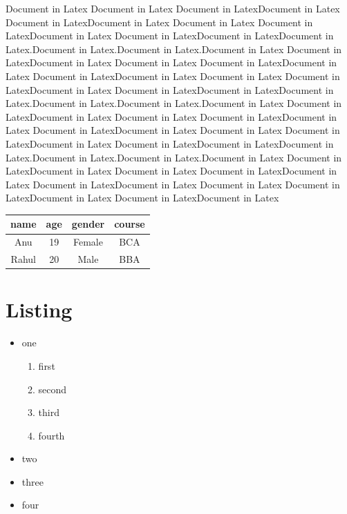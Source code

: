 \documentclass[12pt]{report} %
\begin{document}
\begin{multicols}{2}
Document in Latex Document in Latex Document in LatexDocument in Latex Document in LatexDocument in Latex Document in Latex Document in LatexDocument in Latex Document in LatexDocument in LatexDocument in Latex.Document in Latex.Document in Latex.Document in Latex Document 
in LatexDocument in Latex Document in Latex Document in LatexDocument in Latex Document in 
LatexDocument in Latex Document in Latex Document in LatexDocument in Latex Document in LatexDocument in LatexDocument in Latex.Document in Latex.Document in Latex.Document in Latex Document in LatexDocument in Latex Document in Latex Document in LatexDocument in Latex Document in LatexDocument in Latex Document in Latex Document in LatexDocument in Latex Document in LatexDocument in LatexDocument in Latex.Document in Latex.Document in Latex.Document in Latex Document in LatexDocument in Latex Document in Latex Document in LatexDocument in Latex Document in LatexDocument in Latex Document in Latex Document in LatexDocument in Latex Document in LatexDocument in Latex



\begin{center}

\begin{tabular}{|c|c|c|c|}
\hline
name & age & gender & course   \\
\hline
Anu & 19	& Female & BCA \\
\hline
Rahul & 20 & Male & BBA\\
\hline
\end{tabular}

\end{center}

\section{Listing}
\begin{itemize}
\item one

\begin{enumerate}[label=\Alph*]
\item first
\item second
\item third
\item fourth
\end{enumerate}

\item two
\item three
\item four
\end{itemize}



\end{multicols}
\end{document}
